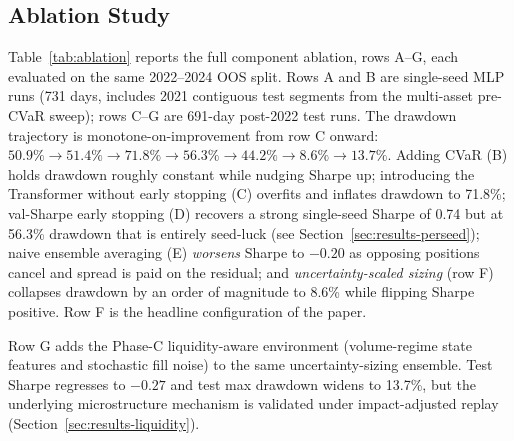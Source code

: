 \documentclass[conference]{IEEEtran}
\begin{document}
\begin{table}[t]
  \centering
  \caption{Main results on the 2022--2024 OOS test split (691 days).}
  \label{tab:main}
\end{table}

\subsection{Ablation Study}
\label{sec:results-ablation}

Table~\ref{tab:ablation} reports the full component ablation, rows A--G,
each evaluated on the same 2022--2024 OOS split. Rows A and B are
single-seed MLP runs (731 days, includes 2021 contiguous test segments
from the multi-asset pre-CVaR sweep); rows C--G are 691-day
post-2022 test runs. The drawdown trajectory is monotone-on-improvement
from row C onward: $50.9\% \to 51.4\% \to 71.8\% \to 56.3\% \to 44.2\%
\to \mathbf{8.6\%} \to 13.7\%$. Adding CVaR (B) holds drawdown roughly
constant while nudging Sharpe up; introducing the Transformer without
early stopping (C) overfits and inflates drawdown to 71.8\%; val-Sharpe
early stopping (D) recovers a strong single-seed Sharpe of 0.74 but at
56.3\% drawdown that is entirely seed-luck (see
Section~\ref{sec:results-perseed}); naive ensemble averaging (E)
\emph{worsens} Sharpe to $-0.20$ as opposing positions cancel and spread
is paid on the residual; and \emph{uncertainty-scaled sizing} (row F)
collapses drawdown by an order of magnitude to 8.6\% while flipping
Sharpe positive. Row F is the headline configuration of the paper.

Row G adds the Phase-C liquidity-aware environment (volume-regime state
features and stochastic fill noise) to the same uncertainty-sizing
ensemble. Test Sharpe regresses to $-0.27$ and test max drawdown widens
to 13.7\%, but the underlying microstructure mechanism is validated
under impact-adjusted replay (Section~\ref{sec:results-liquidity}).
\end{document}
